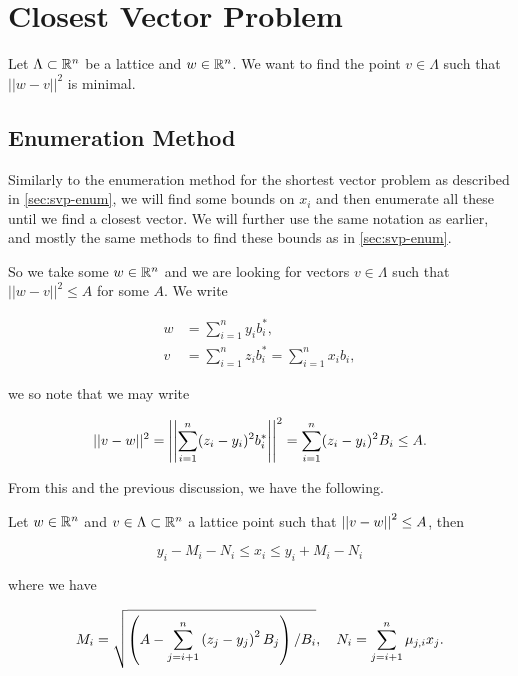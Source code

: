 \section{Closest Vector Problem}

  \begin{problem}
    \label{pb:cvp}
    Let $\Lambda \subset \mathbb{R}^n$ be a lattice and $w \in \mathbb{R}^n$. We want to find the point $v \in \Lambda$ such that $||w-v||^2$ is minimal.
  \end{problem}


\subsection{Enumeration Method}

  Similarly to the enumeration method for the shortest vector problem as described in \cref{sec:svp-enum}, we will find some bounds on $x_i$ and then enumerate all these until we find a closest vector.
  We will further use the same notation as earlier, and mostly the same methods to find these bounds as in \cref{sec:svp-enum}.

  So we take some $w \in \mathbb{R}^n$ and we are looking for vectors $v \in \Lambda$ such that $||w - v||^2 \leq A$ for some $A$.
  We write
  
  \begin{align}
    w &= \sum_{i=1}^{n} y_i b_i^*, \\
    v &= \sum_{i=1}^{n} z_i b_i^* = \sum_{i=1}^{n} x_i b_i,
  \end{align}

  we so note that we may write

  \begin{equation}
    ||v - w||^2 = \left|\left|  \sum_{i=1}^{n} (z_i - y_i)^2 b_i^*  \right|\right|^2
    = \sum_{i=1}^{n} (z_i - y_i)^2 B_i \leq A.
  \end{equation}

  From this and the previous discussion, we have the following.

  \begin{theorem}
    Let $w \in \mathbb{R}^n$ and $v\in \Lambda \subset \mathbb{R}^n$ a lattice point such that $\left|\left|  v - w  \right|\right|^2 \leq A$, then

    \begin{equation}
      y_i - M_i - N_i \leq x_i \leq y_i + M_i - N_i
    \end{equation}

    where we have

    \begin{equation}
      M_i = \sqrt{ \left(  A - \sum_{j=i+1}^{n} \left(  z_j - y_j  \right)^2 B_j  \right) / B_i }, \quad N_i = \sum_{j=i+1}^{n} \mu_{j,i} x_j.
    \end{equation}
  \end{theorem}

